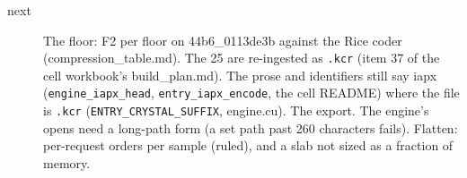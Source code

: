 \begin{description}
\item[{next}] The floor: F2 per floor on 44b6\_\allowbreak{}0113de3b against the Rice coder (compression\_\allowbreak{}table.md). The 25 are re-ingested as \texttt{.\allowbreak{}kcr} (item 37 of the cell workbook's build\_\allowbreak{}plan.md). The prose and identifiers still say iapx (\texttt{engine\_\allowbreak{}iapx\_\allowbreak{}head}, \texttt{entry\_\allowbreak{}iapx\_\allowbreak{}encode}, the cell README) where the file is \texttt{.\allowbreak{}kcr} (\texttt{ENTRY\_\allowbreak{}CRYSTAL\_\allowbreak{}SUFFIX}, engine.cu). The export. The engine's opens need a long-path form (a set path past 260 characters fails). Flatten: per-request orders per sample (ruled), and a slab not sized as a fraction of memory.
\end{description}

